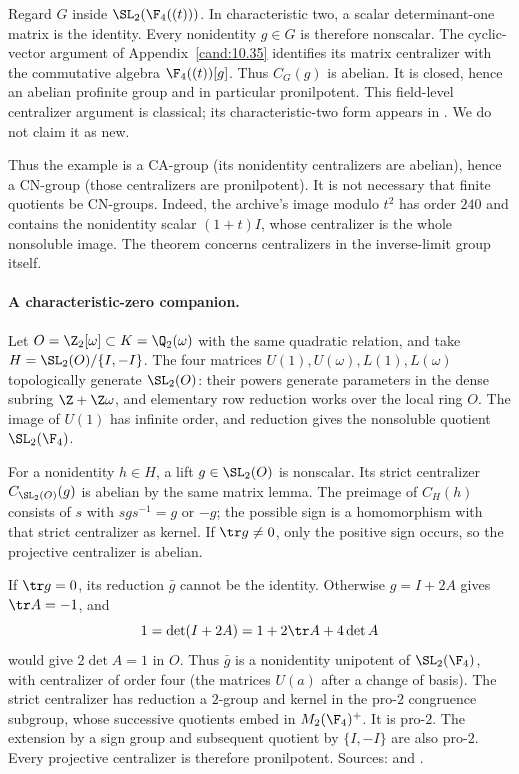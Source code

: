 Regard \(G\) inside \(\SL_2(\F_4((t)))\). In characteristic
two, a scalar determinant-one matrix is the identity.
Every nonidentity \(g\in G\) is therefore nonscalar.
The cyclic-vector argument of Appendix~\ref{cand:10.35}
identifies its matrix centralizer with the commutative algebra
\(\F_4((t))[g]\). Thus \(C_G(g)\) is abelian.
It is closed, hence an abelian profinite group and in
particular pronilpotent. This field-level centralizer
argument is classical; its characteristic-two form appears
in \cite{fine-ct}. We do not claim it as new.

Thus the example is a CA-group (its nonidentity centralizers are
abelian), hence a CN-group (those centralizers are pronilpotent).
It is not necessary that finite quotients be CN-groups.
Indeed, the archive's image modulo \(t^2\) has order \(240\)
and contains the nonidentity scalar \((1+t)I\), whose
centralizer is the whole nonsoluble image. The theorem
concerns centralizers in the inverse-limit group itself.

\paragraph{A characteristic-zero companion.}
Let \(O=\Z_2[\omega]\subset K=\Q_2(\omega)\) with the same
quadratic relation, and take
\(H=\SL_2(O)/\{I,-I\}\).
The four matrices \(U(1),U(\omega),L(1),L(\omega)\)
topologically generate \(\SL_2(O)\): their powers generate
parameters in the dense subring \(\Z+\Z\omega\), and
elementary row reduction works over the local ring \(O\).
The image of \(U(1)\) has infinite order, and reduction
gives the nonsoluble quotient \(\SL_2(\F_4)\).

For a nonidentity \(h\in H\), a lift \(g\in\SL_2(O)\)
is nonscalar. Its strict centralizer \(C_{\SL_2(O)}(g)\)
is abelian by the same matrix lemma. The preimage of
\(C_H(h)\) consists of \(s\) with \(sgs^{-1}=g\) or \(-g\);
the possible sign is a homomorphism with that strict
centralizer as kernel. If \(\tr g\ne0\), only the
positive sign occurs, so the projective centralizer is
abelian.

If \(\tr g=0\), its reduction \(\bar g\) cannot be the
identity. Otherwise \(g=I+2A\) gives \(\tr A=-1\), and
\[
 1=\det(I+2A)=1+2\tr A+4\det A
\]
would give \(2\det A=1\) in \(O\).
Thus \(\bar g\) is a nonidentity unipotent of
\(\SL_2(\F_4)\), with centralizer of order four
(the matrices \(U(a)\) after a change of basis).
The strict centralizer has reduction a \(2\)-group and
kernel in the pro-\(2\) congruence subgroup, whose
successive quotients embed in \(M_2(\F_4)^+\).
It is pro-\(2\). The extension by a sign group and
subsequent quotient by \(\{I,-I\}\) are also pro-\(2\).
Every projective centralizer is therefore pronilpotent.
Sources:  and
.


